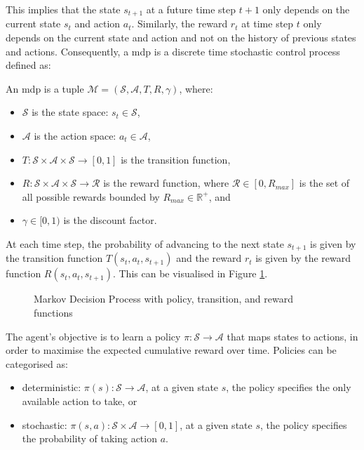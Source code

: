 This implies that the state $s_{t+1}$ at a future time step $t+1$ only depends on the current state $s_t$ and action $a_t$. Similarly, the reward $r_t$ at time step $t$ only depends on the current state and action and not on the history of previous states and actions. Consequently, a \acrlong{mdp} \cite{Bellman1957} is a discrete time stochastic control process defined as:

\begin{definition}
    An \acrshort{mdp} is a tuple $\mathcal{M} = \left(\mathcal{S}, \mathcal{A}, T, R, \gamma\right)$, where:
    \begin{itemize}
        \item $\mathcal{S}$ is the state space: $s_t \in \mathcal{S}$,
        \item $\mathcal{A}$ is the action space: $a_t \in \mathcal{A}$,
        \item $T: \mathcal{S} \times \mathcal{A} \times \mathcal{S} \rightarrow [0, 1]$ is the transition function,
        \item $R: \mathcal{S} \times \mathcal{A} \times \mathcal{S} \rightarrow \mathcal{R}$ is the reward function, where $\mathcal{R} \in \left[0, R_{max}\right]$ is the set of all possible rewards bounded by $R_{max} \in \mathbb{R}^+$, and
        \item $\gamma \in [0, 1)$ is the discount factor.
    \end{itemize}
    
\end{definition}

At each time step, the probability of advancing to the next state $s_{t+1}$ is given by the transition function $T(s_t, a_t, s_{t+1})$ and the reward $r_t$ is given by the reward function $R(s_t, a_t, s_{t+1})$. This can be visualised in Figure \ref{fig:mdp}.

\begin{figure}[ht]
    \label{fig:mdp}
    \centering
    
    \caption{Markov Decision Process with policy, transition, and reward functions}
\end{figure}

The agent's objective is to learn a policy $\pi: \mathcal{S} \rightarrow \mathcal{A}$ that maps states to actions, in order to maximise the expected cumulative reward over time. Policies can be categorised as:
\begin{itemize}
    \item deterministic: $\pi(s) : \mathcal{S} \to \mathcal{A}$, at a given state $s$, the policy specifies the only available action to take, or
    \item stochastic: $\pi(s, a) : \mathcal{S} \times \mathcal{A} \to [0, 1]$, at a given state $s$, the policy specifies the probability of taking action $a$.
\end{itemize}


